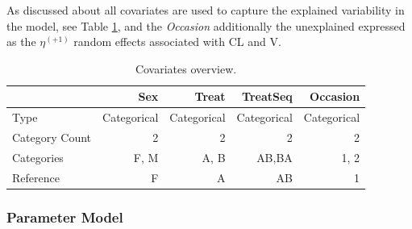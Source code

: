 As discussed about all covariates are used to capture the explained variability in the model, 
see Table \ref{tab:CovariatesOverview}, and the \emph{Occasion} additionally
the unexplained expressed as the $\eta^{(+1)}$ random effects associated with CL and V.

\begin{table}[h]
\begin{center}
\renewcommand{\arraystretch}{1.1}%
\begin{tabular}{lrrrr}\toprule
 & \textbf{Sex} &{\color{red}\textbf{Treat}}&{\color{mediumgreen}\textbf{TreatSeq}}&{\color{magenta}\textbf{Occasion}}\\\midrule
Type & Categorical & Categorical & Categorical & Categorical  \\
Category Count & 2 & 2 & 2 & 2\\
Categories & F, M & A, B & AB,BA & 1, 2\\
Reference & F & A & AB & 1\\
\bottomrule
\end{tabular}
\end{center}
\caption{Covariates overview.}
\label{tab:CovariatesOverview}
\end{table}

\subsubsection{Parameter Model}

